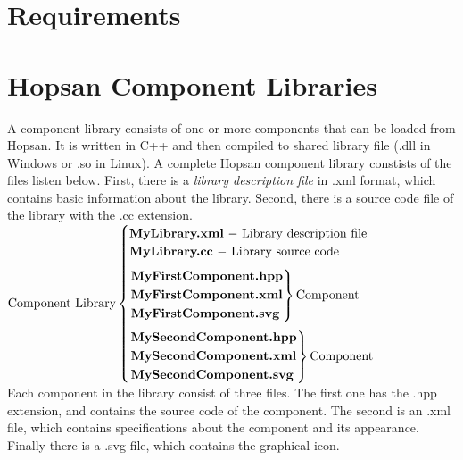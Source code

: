 \documentclass[a4paper,pdftex]{article}
\begin{document}

\section*{Requirements}

\section*{Hopsan Component Libraries}
A component library consists of one or more components that can be loaded from Hopsan. It is written in C++ and then compiled to shared library file (.dll in Windows or .so in Linux). A complete Hopsan component library constists of the files listen below. First, there is a \textit{library description file} in .xml format, which contains basic information about the library. Second, there is a source code file of the library with the .cc extension.\vspace{10pt}\\
$\mathrm{Component\ Library} \begin{cases}
\mathtt{\textbf{MyLibrary.xml}} \mathrm{\ -\ Library\ description\ file}\\
\mathtt{\textbf{MyLibrary.cc}} \mathrm{\ -\ Library\ source\ code}\vspace{7pt} \\ 
\begin{rcases}
  \mathtt{\textbf{MyFirstComponent.hpp}} \\
  \mathtt{\textbf{MyFirstComponent.xml}} \\
  \mathtt{\textbf{MyFirstComponent.svg}}
\end{rcases} \mathrm{Component}\vspace{7pt} \\
\begin{rcases}
  \mathtt{\textbf{MySecondComponent.hpp}} \\
  \mathtt{\textbf{MySecondComponent.xml}} \\
  \mathtt{\textbf{MySecondComponent.svg}}
\end{rcases} \mathrm{Component} \\
\end{cases}$
\vspace{10pt}\\
Each component in the library consist of three files. The first one has the .hpp extension, and contains the source code of the component. The second is an .xml file, which contains specifications about the component and its appearance. Finally there is a .svg file, which contains the graphical icon.
\end{document}

